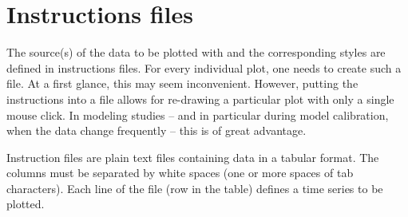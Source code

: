 \section{Instructions files} \label{sec:tsplot:instructions}

The source(s) of the data to be plotted with  and the corresponding styles are defined in instructions files. For every individual plot, one needs to create such a file. At a first glance, this may seem inconvenient. However, putting the instructions into a file allows for re-drawing a particular plot with only a single mouse click. In modeling studies -- and in particular during model calibration, when the data change frequently -- this is of great advantage.

Instruction files are plain text files containing data in a tabular format. The columns must be separated by white spaces (one or more spaces of tab characters). Each line of the file (row in the table) defines a time series to be plotted.


